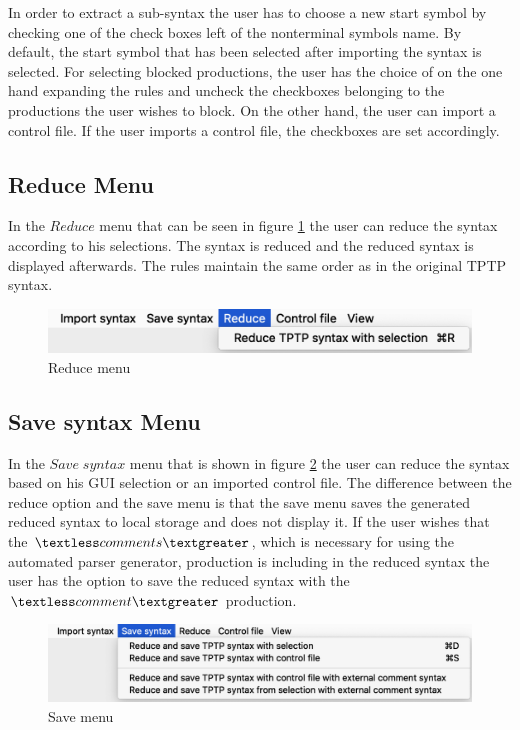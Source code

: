 In order to extract a sub-syntax the user has to choose a new start symbol by checking one of the check boxes left of the nonterminal symbols name. By default, the start symbol that has been selected after importing the syntax is selected. For selecting blocked productions, the user has the choice of on the one hand expanding the rules and uncheck the checkboxes belonging to the productions the user wishes to block. On the other hand, the user can import a control file. If the user imports a control file, the checkboxes are set accordingly.

\subsection{Reduce Menu}\label{sec:ConceptGUIReduceMenu}

In the $Reduce$ menu that can be seen in figure \ref{fig:reduce} the user can reduce the syntax according to his selections. The syntax is reduced and the reduced syntax is displayed afterwards. The rules maintain the same order as in the original \ac{TPTP} syntax.

\begin{figure}[H]
\centering
\includegraphics[width=.7\textwidth]{images/reduce.png}
\caption{Reduce menu}
\label{fig:reduce}
\end{figure}

\subsection{Save syntax Menu}\label{sec:ConceptGUISaveSyntaxMenu}

In the $Save\;syntax$ menu that is shown in figure \ref{fig:save} the user can reduce the syntax based on his GUI selection or an imported control file. The difference between the reduce option and the save menu is that the save menu saves the generated reduced syntax to local storage and does not display it. If the user wishes that the $\textless comments\textgreater$, which is necessary for using the automated parser generator, production is including in the reduced syntax the user has the option to save the reduced syntax with the $\textless comment\textgreater$ production.

\begin{figure}[H]
\centering
\includegraphics[width=.7\textwidth]{images/save.png}
\caption{Save menu}
\label{fig:save}
\end{figure}

